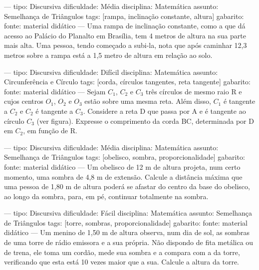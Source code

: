 ---
tipo: Discursiva
dificuldade: Média
disciplina: Matemática
assunto: Semelhança de Triângulos
tags: [rampa, inclinação constante, altura]
gabarito:
fonte: material didático
---
\question
Uma rampa de inclinação constante, como a que dá acesso ao Palácio do Planalto em Brasília, tem 4 metros de altura na sua parte mais alta. Uma pessoa, tendo começado a subi-la, nota que após caminhar 12,3 metros sobre a rampa está a 1,5 metro de altura em relação ao solo.

---
tipo: Discursiva
dificuldade: Difícil
disciplina: Matemática
assunto: Circunferência e Círculo
tags: [corda, círculos tangentes, reta tangente]
gabarito:
fonte: material didático
---
\question
Sejam $C_1$, $C_2$ e $C_3$ três círculos de mesmo raio R e cujos centros $O_1$, $O_2$ e $O_3$ estão sobre uma mesma reta. Além disso, $C_1$ é tangente a $C_2$ e $C_2$ é tangente a $C_3$. Considere a reta D que passa por A e é tangente ao círculo $C_3$ (ver figura). Expresse o comprimento da corda BC, determinada por D em $C_2$, em função de R.


---
tipo: Discursiva
dificuldade: Média
disciplina: Matemática
assunto: Semelhança de Triângulos
tags: [obelisco, sombra, proporcionalidade]
gabarito:
fonte: material didático
---
\question
Um obelisco de 12 m de altura projeta, num certo momento, uma sombra de 4,8 m de extensão. Calcule a distância máxima que uma pessoa de 1,80 m de altura poderá se afastar do centro da base do obelisco, ao longo da sombra, para, em pé, continuar totalmente na sombra.

---
tipo: Discursiva
dificuldade: Fácil
disciplina: Matemática
assunto: Semelhança de Triângulos
tags: [torre, sombras, proporcionalidade]
gabarito:
fonte: material didático
---
\question
Um menino de 1,50 m de altura observa, num dia de sol, as sombras de uma torre de rádio emissora e a sua própria. Não dispondo de fita metálica ou de trena, ele toma um cordão, mede sua sombra e a compara com a da torre, verificando que esta está 10 vezes maior que a sua. Calcule a altura da torre.

